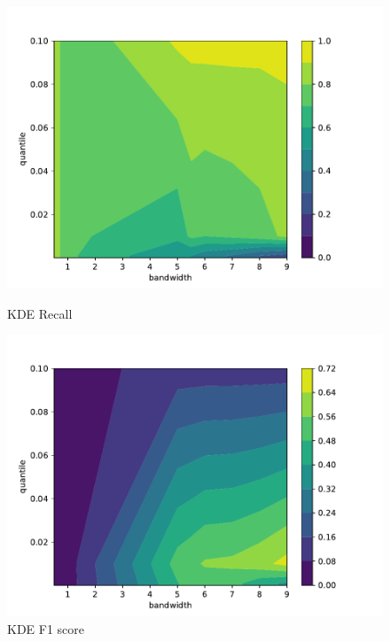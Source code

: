 \begin{figure}[!htb]
    \begin{minipage}[t]{0.5\textwidth}
        \vspace{0pt}
        \includegraphics[width=\textwidth]{images/kde-recall.pdf}
        \caption{KDE Recall}
    \end{minipage}
    \hfill
    \begin{minipage}[t]{0.5\textwidth}
        \vspace{0pt}
        \includegraphics[width=\textwidth]{images/kde-f1.pdf}
        \caption{KDE F1 score}
    \end{minipage}
\end{figure}

\noindent

